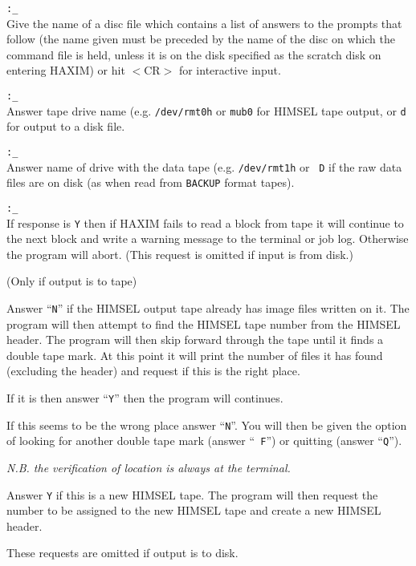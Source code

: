 \begin{description}
\item[{\tt INPUT file (TT or $<$CR$>$ for terminal) }]{\tt :\_}\\
Give the name of a disc file which contains a list of answers to the
prompts that follow (the name given must be preceded by the name of the
disc on which the command file is held, unless it is on the disk
specified as the scratch disk on entering HAXIM) or hit $<$CR$>$ for
interactive input.

\item[{\tt Tape drive with HIMSEL tape or D for disk }]{\tt :\_}\\
Answer tape drive name (e.g. \verb!/dev/rmt0h! or \verb!mub0! for
HIMSEL tape output, or {\tt d} for output to a disk file.

\item[{\tt Drive holding PD tape? (or D for disk) }]{\tt :\_}\\
Answer name of drive with the data tape (e.g. \verb!/dev/rmt1h! or {\tt
D} if the raw data files are on disk (as when read from {\tt BACKUP}
format tapes).

\item[{\tt Skip on read errors? (Y/N) }]{\tt :\_}\\
If response is {\tt Y} then if HAXIM fails to read a block from tape it
will continue to the next block and write a warning message to the
terminal or job log. Otherwise the program will abort. (This request is
omitted if input is from disk.)

\item[{\tt New output tape (Y/N) :\_}] (Only if output is to tape)
\begin{description}
\item Answer ``{\tt N}'' if the HIMSEL output tape  already has image files written
on it. The program will then attempt to find the HIMSEL tape number
from the HIMSEL header. The program will then skip forward through the
tape until it finds a double tape mark. At this point it will print the
number of files it has found (excluding the header) and request if this
is the right place.
\begin{description}
\item If it is then answer ``{\tt Y}'' then the program will continues.
\item If this seems to be the wrong place answer ``{\tt N}''. You will then be
given the option of looking for another double tape mark (answer ``{\tt
F}'') or quitting (answer ``{\tt Q}'').
\end{description}
{\em N.B. the verification of location is always at the terminal.}
\item Answer {\tt Y} if this is a new HIMSEL tape. The program will then
request the number to be assigned to the new HIMSEL tape and create a
new HIMSEL header.
\end{description}
These requests are omitted if output is to disk.


\end{description}
